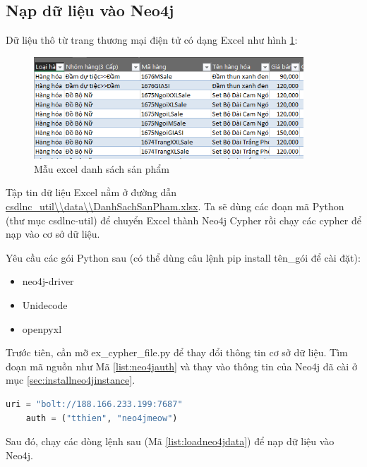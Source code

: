 \subsection{Nạp dữ liệu vào Neo4j}\label{sec:csdlncutil}

Dữ liệu thô từ trang thương mại điện tử có dạng Excel như hình \ref{fig:excelsample}:  

\begin{figure}[H]
\centering
\includegraphics[width=0.9\textwidth]{imagev2/danhsachsanpham.PNG}
\caption{\label{fig:excelsample} Mẫu excel danh sách sản phẩm}
\end{figure}

Tập tin dữ liệu Excel nằm ở đường dẫn \url{csdlnc_util\\data\\DanhSachSanPham.xlsx}. Ta sẽ dùng các đoạn mã Python (thư mục csdlnc-util) để chuyển Excel thành Neo4j Cypher rồi chạy các cypher để nạp vào cơ sở dữ liệu. 

Yêu cầu các gói Python sau (có thể dùng câu lệnh pip install tên\_gói để cài đặt): 

\begin{itemize}
\item neo4j-driver
\item Unidecode 
\item openpyxl
\end{itemize}

Trước tiên, cần mỡ ex\_cypher\_file.py để thay đổi thông tin cơ sở dữ liệu. Tìm đoạn mã nguồn như Mã \ref{list:neo4jauth} và thay vào thông tin của Neo4j đã cài ở mục \ref{sec:installneo4jinstance}.

\begin{lstlisting}[language=python,caption={Thông tin Neo4j},label={list:neo4jauth}]
    uri = "bolt://188.166.233.199:7687"
    auth = ("tthien", "neo4jmeow")
\end{lstlisting}

Sau đó, chạy các dòng lệnh sau (Mã \ref{list:loadneo4jdata}) để nạp dữ liệu vào Neo4j.

